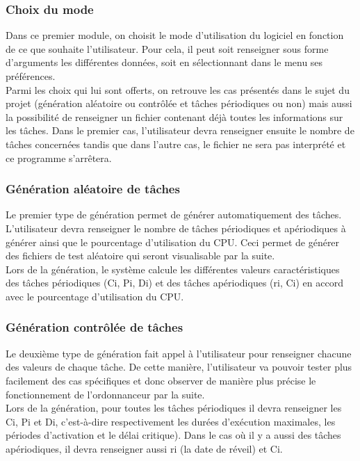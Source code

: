 			\subsubsection{Choix du mode}
				Dans ce premier module, on choisit le mode d’utilisation du logiciel en fonction de ce que souhaite l’utilisateur. Pour cela, il peut soit renseigner sous forme d’arguments les différentes données, soit en sélectionnant dans le menu ses préférences. \\

				Parmi les choix qui lui sont offerts, on retrouve les cas présentés dans le sujet du projet (génération aléatoire ou contrôlée et tâches périodiques ou non) mais aussi la possibilité de renseigner un fichier contenant déjà toutes les informations sur les tâches. Dans le premier cas, l’utilisateur devra renseigner ensuite le nombre de tâches concernées tandis que dans l’autre cas, le fichier ne sera pas interprété et ce programme s’arrêtera.


			\subsubsection{Génération aléatoire de tâches}
				Le premier type de génération permet de générer automatiquement des tâches. L'utilisateur devra renseigner le nombre de tâches périodiques et apériodiques à générer ainsi que le pourcentage d'utilisation du CPU. Ceci permet de générer des fichiers de test aléatoire qui seront visualisable par la suite.\\
				Lors de la génération, le système calcule les différentes valeurs caractéristiques des tâches périodiques (Ci, Pi, Di) et des tâches apériodiques (ri, Ci) en accord avec le pourcentage d'utilisation du CPU. 

			\subsubsection{Génération contrôlée de tâches}
				Le deuxième type de génération fait appel à l'utilisateur pour renseigner chacune des valeurs de chaque tâche. De cette manière, l'utilisateur va pouvoir tester plus facilement des cas spécifiques et donc observer de manière plus précise le fonctionnement de l'ordonnanceur par la suite. \\
				Lors de la génération, pour toutes les tâches périodiques il devra renseigner les Ci, Pi et Di, c'est-à-dire respectivement les durées d'exécution maximales, les périodes d'activation et le délai critique). Dans le cas où il y a aussi des tâches apériodiques, il devra renseigner aussi ri (la date de réveil) et Ci.

